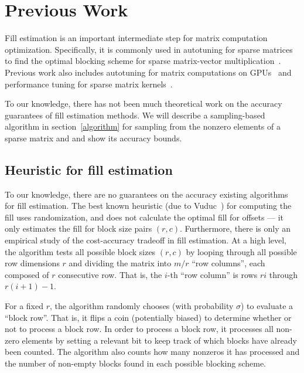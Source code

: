 
\section{Previous Work}
Fill estimation is an important intermediate step for matrix computation optimization. 
Specifically, it is commonly used in autotuning for sparse matrices to find the
optimal blocking scheme for sparse matrix-vector multiplication~\cite{WillOlVu09, VuducDeYe02, YilmAkGa16, VuducMo05}.
Previous work also includes autotuning for matrix computations on 
GPUs~\cite{ChoiSiVu10} and performance tuning for sparse matrix kernels~\cite{ImYeVu04, ImYe01}. 

To our knowledge, there has not been much theoretical work on the accuracy guarantees of fill estimation methods. We will describe
a sampling-based algorithm in section~\ref{algorithm} for sampling from the nonzero elements of a sparse matrix and
and show its accuracy bounds.

\subsection{Heuristic for fill estimation}

To our knowledge, there are no guarantees on the accuracy existing algorithms for fill estimation. The best known heuristic (due to Vuduc~\cite{vuduc04}) for computing the fill uses randomization, and does not calculate the optimal fill for offsets --- it only estimates the fill for block size pairs $(r,c)$. Furthermore, there is only an empirical study of the cost-accuracy tradeoff in fill estimation. At a high level, the algorithm tests all possible block sizes $(r,c)$ by looping through all possible row dimensions $r$ and dividing the matrix into $m/r$ ``row columns'', each composed of $r$ consecutive row. That is, the $i$-th ``row column'' is rows $ri$ through $r(i+1)-1$.

For a fixed $r$, the algorithm randomly chooses (with probability $\sigma$) to evaluate a ``block row''. That is, it flips a coin (potentially biased) to determine whether or not to process a block row. In order to process a block row, it processes all non-zero elements by setting a relevant bit to keep track of which blocks have already been counted. The algorithm also counts how many nonzeros it has processed and the number of non-empty blocks found in each possible blocking scheme.

